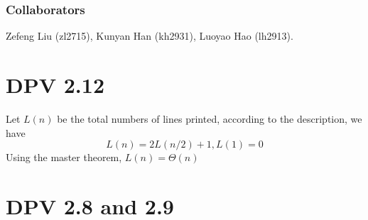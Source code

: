 \documentclass[twoside]{homework}
\begin{document}
\maketitle
\subsubsection*{Collaborators}
Zefeng Liu (zl2715), Kunyan Han (kh2931), Luoyao Hao (lh2913).
\section{DPV 2.12}
Let $L(n)$ be the total numbers of lines printed, according to the description, we have
\[ L(n) = 2L(n/2) + 1, L(1) = 0\]
Using the master theorem, $L(n) = \Theta(n)$

\section{DPV 2.8 and 2.9}
\end{document}
